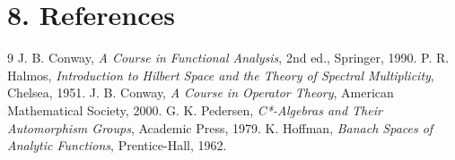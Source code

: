 \section*{8. References}
\begin{thebibliography}{9}
 J. B. Conway, \emph{A Course in Functional Analysis}, 2nd ed., Springer, 1990.
 P. R. Halmos, \emph{Introduction to Hilbert Space and the Theory of Spectral Multiplicity}, Chelsea, 1951.
 J. B. Conway, \emph{A Course in Operator Theory}, American Mathematical Society, 2000.
 G. K. Pedersen, \emph{C*-Algebras and Their Automorphism Groups}, Academic Press, 1979.
 K. Hoffman, \emph{Banach Spaces of Analytic Functions}, Prentice-Hall, 1962.
\end{thebibliography}
